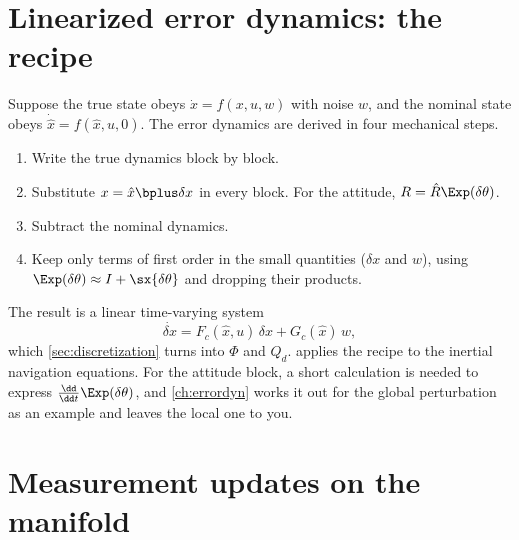 \section{Linearized error dynamics: the recipe}
\label{sec:error-dyn-recipe}

Suppose the true state obeys $\dot x = f(x, u, w)$ with noise $w$, and the nominal state obeys
$\dot{\hat x} = f(\hat x, u, 0)$. The error dynamics are derived in four mechanical steps.
\begin{enumerate}
  \item Write the true dynamics block by block.
  \item Substitute $x = \hat x\bplus\delta x$ in every block. For the attitude, $R = \hat R\Exp(\delta\theta)$.
  \item Subtract the nominal dynamics.
  \item Keep only terms of first order in the small quantities ($\delta x$ and $w$), using
        $\Exp(\delta\theta) \approx I + \sx{\delta\theta}$ and dropping their products.
\end{enumerate}
The result is a linear time-varying system
\begin{equation}
  \dot{\delta x} = F_c(\hat x, u)\,\delta x + G_c(\hat x)\,w,
\end{equation}
which \cref{sec:discretization} turns into $\Phi$ and $Q_d$.  applies the recipe to the
inertial navigation equations. For the attitude block, a short calculation is needed to express
$\frac{\dd}{\dd t}\Exp(\delta\theta)$, and \cref{ch:errordyn} works it out for the global perturbation as an
example and leaves the local one to you.

\section{Measurement updates on the manifold}
\label{sec:manifold-update}

